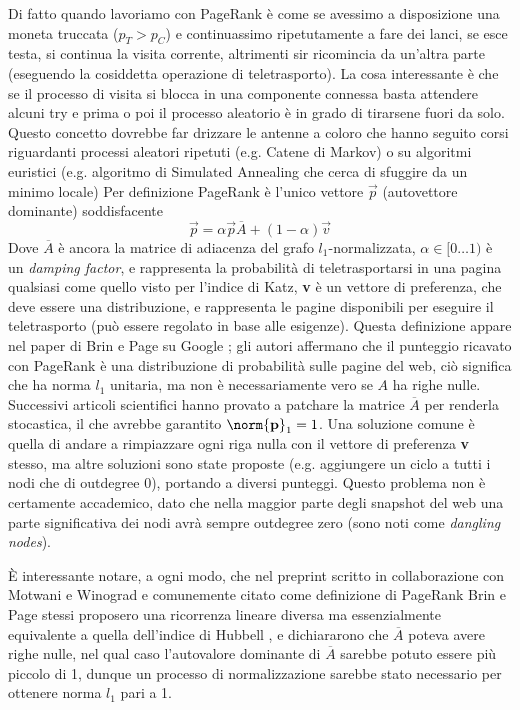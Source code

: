 Di fatto quando lavoriamo con PageRank è come se avessimo a disposizione una moneta truccata ($p_T >
	p_C$) e continuassimo ripetutamente a fare dei lanci, se esce testa, si continua la visita corrente,
altrimenti sir ricomincia da un'altra parte (eseguendo la cosiddetta operazione di teletrasporto). La cosa interessante è che se il processo di visita si blocca in una componente connessa basta attendere alcuni try e prima o poi il processo aleatorio è in grado di tirarsene fuori da solo. Questo concetto dovrebbe far drizzare le antenne a coloro che hanno seguito corsi riguardanti processi aleatori ripetuti (e.g. Catene di Markov) o su algoritmi euristici (e.g. algoritmo di Simulated Annealing che cerca di sfuggire da un minimo locale)
Per definizione PageRank è l'unico vettore $\vec{p}$ (autovettore dominante) soddisfacente
\begin{equation}
	\label{eq:pagerank}
	\vec{p} = \alpha\vec{p}\overline{A} + (1 - \alpha)\vec{v}
\end{equation}
Dove $\overline{A}$ è ancora la matrice di adiacenza del grafo $l_1$-normalizzata, $\alpha \in [0\dots1)$ è un \textit{damping factor}, e rappresenta la probabilità di teletrasportarsi in una pagina qualsiasi come quello visto per l'indice di Katz, \textbf{v} è un vettore di preferenza, che deve essere una distribuzione, e rappresenta le pagine disponibili per eseguire il teletrasporto (può essere regolato in base alle esigenze). Questa definizione appare nel paper di Brin e Page su Google \cite{google}; gli autori affermano che il punteggio ricavato con PageRank è una distribuzione di probabilità sulle pagine del web, ciò significa che ha norma $l_1$ unitaria, ma non è necessariamente vero se $A$ ha righe nulle. Successivi articoli scientifici hanno provato a patchare la matrice $\overline{A}$ per renderla stocastica, il che avrebbe garantito $\norm{\textbf{p}}_1 = 1$. Una soluzione comune è quella di andare a rimpiazzare ogni riga nulla con il vettore di preferenza \textbf{v} stesso, ma altre soluzioni sono state proposte (e.g. aggiungere un ciclo a tutti i nodi che di outdegree 0), portando a diversi punteggi. Questo problema non è certamente accademico, dato che nella maggior parte degli snapshot del web una parte significativa dei nodi avrà sempre outdegree zero (sono noti come \textit{dangling nodes}).

È interessante notare, a ogni modo, che nel preprint scritto in collaborazione con Motwani e Winograd e comunemente citato come definizione di PageRank \cite{prankpreprint} Brin e Page stessi proposero una ricorrenza lineare diversa ma essenzialmente equivalente a quella dell'indice di Hubbell \cite{hub}, e dichiararono che $\overline{A}$ poteva avere righe nulle, nel qual caso l'autovalore dominante di $\overline{A}$ sarebbe potuto essere più piccolo di 1, dunque un processo di normalizzazione sarebbe stato necessario per ottenere norma $l_1$ pari a 1.

